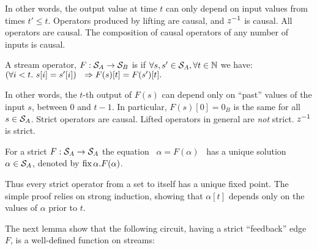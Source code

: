\noindent
In other words, the output value at time $t$ can only depend on
input values from times $t' \leq t$.
Operators produced by lifting are causal, and $z^{-1}$ is causal.
All \dbsp operators are causal.  The composition
of causal operators of any number of inputs is causal.

\begin{definition}[Strictness]
A stream operator, $F:\mathcal{S}_{A}\to\mathcal{S}_{B}$
is 
if  $\forall s,s'\in\mathcal{S}_{A}, \forall t \in \mathbb{N}$ we have:
$(\forall i<t . ~s[i]=s'[i]) ~~\Rightarrow \\ F(s)[t]=F(s')[t].$
\end{definition}

In other words, the $t$-th output of $F(s)$ can depend only on ``past'' values
of the input $s$, between $0$ and $t-1$.
In particular, $F(s)[0] = 0_B$ is the same for all $s \in \mathcal{S}_{A}$.
Strict operators are causal. Lifted operators in general are \emph{not} strict.
$z^{-1}$ is strict.  %

\begin{proposition}
\label{prop-unique-fix}
For a strict $F: \mathcal{S}_{A} \to \mathcal{S}_{A}$ the equation ~$\alpha=F(\alpha)$~ has a unique
solution $\alpha \in \mathcal{S}_{A}$, denoted by $\mbox{fix}\,\alpha.F(\alpha)$.
\end{proposition}

Thus every strict operator from a set to itself has a unique fixed point.
The simple proof relies on strong induction, showing that $\alpha[t]$
depends only on the values of $\alpha$ prior to $t$.

The next lemma show that the following circuit, having a strict
``feedback'' edge $F$, is a well-defined function on streams:
\begin{center}
\end{center}


